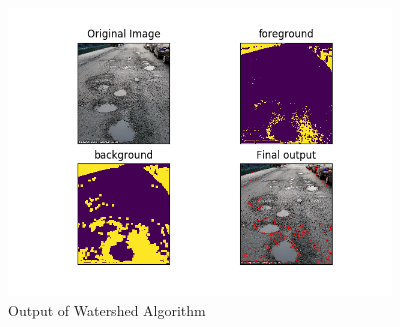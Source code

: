 \documentclass[12pt,a4paper]{article}
\begin{document}
\begin{itemize}
%
    

    \begin{figure}[ht!]
        \centering
        \includegraphics[width = 4in]{images/watershed_2.png}
        \caption{Output of Watershed Algorithm}
    \end{figure}
    

    

    

\end{itemize}
\end{document}
